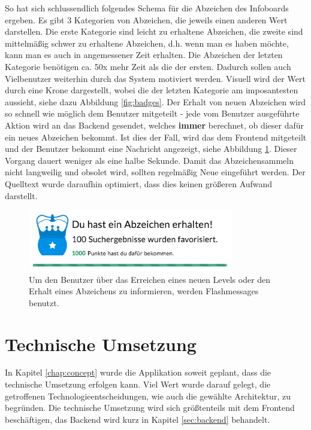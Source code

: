 \documentclass[12pt,twoside]{book}
\begin{document}
So hat sich schlussendlich folgendes Schema für die Abzeichen des Infoboards ergeben. Es gibt 3 Kategorien von Abzeichen, die jeweils einen anderen Wert darstellen. Die erste Kategorie sind leicht zu erhaltene Abzeichen, die zweite sind mittelmäßig schwer zu erhaltene Abzeichen, d.h. wenn man es haben möchte, kann man es auch in angemessener Zeit erhalten. Die Abzeichen der letzten Kategorie benötigen ca. 50x mehr Zeit als die der ersten. Dadurch sollen auch Vielbenutzer weiterhin durch das System motiviert werden. Visuell wird der Wert durch eine Krone dargestellt, wobei die der letzten Kategorie am imposantesten aussieht, siehe dazu Abbildung \ref{fig:badges}.
Der Erhalt von neuen Abzeichen wird so schnell wie möglich dem Benutzer mitgeteilt - jede vom Benutzer ausgeführte Aktion wird an das Backend gesendet, welches \textbf{immer} berechnet, ob dieser dafür ein neues Abzeichen bekommt. Ist dies der Fall, wird das dem Frontend mitgeteilt und der Benutzer bekommt eine Nachricht angezeigt, siehe Abbildung \ref{fig:flashmessage}. Dieser Vorgang dauert weniger als eine halbe Sekunde.
Damit das Abzeichensammeln nicht langweilig und obsolet wird, sollten regelmäßig Neue eingeführt werden. Der Quelltext wurde daraufhin optimiert, dass dies keinen größeren Aufwand darstellt.

\begin{figure}[htbp]
    \centering
    \includegraphics[width=0.8\textwidth]{images/infoboard_flashmessage.png}
    \caption{Um den Benutzer über das Erreichen eines neuen Levels oder den Erhalt eines Abzeichens zu informieren, werden Flashmessages benutzt.}
    \label{fig:flashmessage}
\end{figure}

\chapter{Technische Umsetzung}\label{chap:tech}

In Kapitel \ref{chap:concept} wurde die Applikation soweit geplant, dass die technische Umsetzung erfolgen kann. Viel Wert wurde darauf gelegt, die getroffenen Technologieentscheidungen, wie auch die gewählte Architektur, zu begründen.
Die technische Umsetzung wird sich größtenteils mit dem Frontend beschäftigen, das Backend wird kurz in Kapitel \ref{sec:backend} behandelt.
\end{document}
